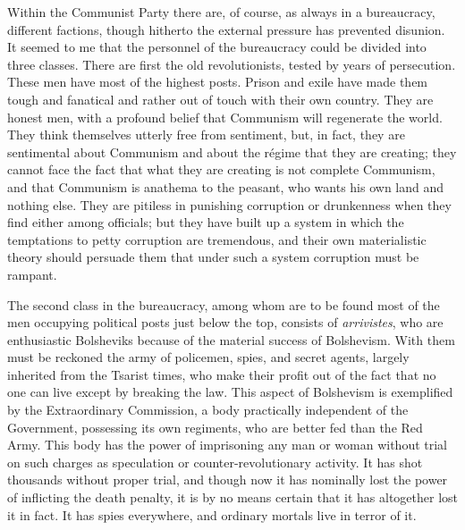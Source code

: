 Within the Communist Party there are, of course, as always in a bureaucracy, different factions, though hitherto the external pressure has prevented disunion. It seemed to me that the personnel of the bureaucracy could be divided into three classes. There are first the old revolutionists, tested by years of persecution. These men have most of the highest posts. Prison and exile have made them tough and fanatical and rather out of touch with their own country. They are honest men, with a profound belief that Communism will regenerate the world. They think themselves utterly free from sentiment, but, in fact, they are sentimental about Communism and about the régime that they are creating; they cannot face the fact that what they are creating is not complete Communism, and that Communism is anathema to the peasant, who wants his own land and nothing else. They are pitiless in punishing corruption or drunkenness when they find either among officials; but they have built up a system in which the temptations to petty corruption are tremendous, and their own materialistic theory should persuade them that under such a system corruption must be rampant.

The second class in the bureaucracy, among whom are to be found most of the men occupying political posts just below the top, consists of \emph{arrivistes}, who are enthusiastic Bolsheviks because of the material success of Bolshevism. With them must be reckoned the army of policemen, spies, and secret agents, largely inherited from the Tsarist times, who make their profit out of the fact that no one can live except by breaking the law. This aspect of Bolshevism is exemplified by the Extraordinary Commission, a body practically independent of the Government, possessing its own regiments, who are better fed than the Red Army. This body has the power of imprisoning any man or woman without trial on such charges as speculation or counter-revolutionary activity. It has shot thousands without proper trial, and though now it has nominally lost the power of inflicting the death penalty, it is by no means certain that it has altogether lost it in fact. It has spies everywhere, and ordinary mortals live in terror of it.

